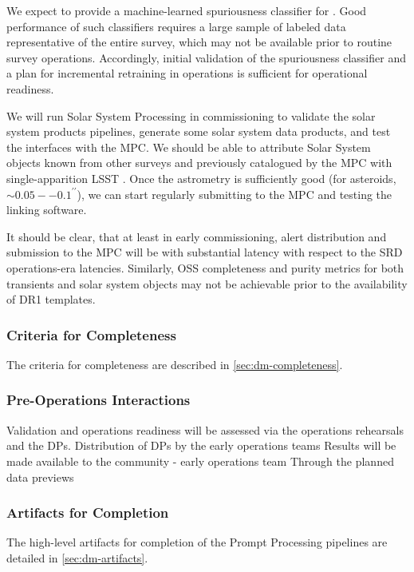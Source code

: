 
We expect to provide a machine-learned spuriousness classifier for \DIASources.
Good performance of such classifiers requires a large sample of labeled data representative of the entire survey, which may not be available prior to routine survey operations.
Accordingly, initial validation of the spuriousness classifier and a plan for incremental retraining in operations is sufficient for operational readiness.

We will run Solar System Processing in commissioning to validate the solar system products pipelines, generate some solar system data products, and test the interfaces with the MPC.
We should be able to attribute Solar System objects known from other surveys and previously catalogued by the MPC with single-apparition LSST \DIASources.
Once the astrometry is sufficiently good (for asteroids,  $\sim0.05--0.1^{\prime\prime}$), we can start regularly submitting to the MPC and testing the linking software.

It should be clear, that at least in early commissioning, alert distribution and submission to the MPC will be with substantial latency with respect to the SRD operations-era latencies.
Similarly, OSS completeness and purity metrics for both transients and solar system objects may not be achievable prior to the availability of DR1 templates.

\subsubsection{Criteria for Completeness}
The criteria for completeness are described in \ref{sec:dm-completeness}.

\subsubsection{Pre-Operations Interactions}
Validation and operations readiness will be assessed via the operations rehearsals and the DPs.
Distribution of DPs by the early operations teams
Results will be made available to the community - early operations team
Through the planned data previews

\subsubsection{Artifacts for Completion}
The high-level artifacts for completion of the Prompt Processing pipelines are detailed in \ref{sec:dm-artifacts}.

